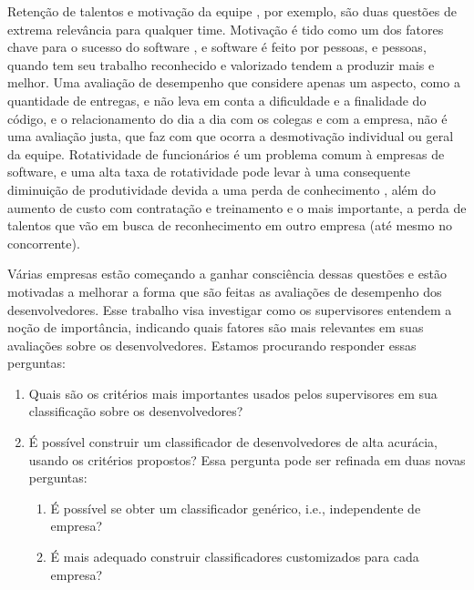 Retenção de talentos \cite{Boehm2000, Chatzoglou1997, DeMarco1987, Guzzo1988, Scudder1991, Wohlin1995, Wohlin2001} e motivação da equipe \cite{Boehm1987, DeMarco1987, Boehm1984, Jones2000, Sharp2009, Boehm1982, Boehm1988, Hantos2000}, por exemplo, são duas questões de extrema relevância para qualquer time. Motivação é tido como um dos fatores chave para o sucesso do software \cite{Sharp2009}, e software é feito por pessoas, e pessoas, quando tem seu trabalho reconhecido e valorizado tendem a produzir mais e melhor. Uma avaliação de desempenho que considere apenas um aspecto, como a quantidade de entregas, e não leva em conta a dificuldade e a finalidade do código, e o relacionamento do dia a dia com os colegas e com a empresa, não é uma avaliação justa, que faz com que ocorra a desmotivação individual ou geral da equipe. Rotatividade de funcionários é um problema comum à empresas de software\cite{Abdel-Hamid1991, Wallace2004}, e uma alta taxa de rotatividade pode levar à uma consequente diminuição de produtividade devida a uma perda de conhecimento \cite{Melo2011, Coram2005}, além do aumento de custo com contratação e treinamento e o mais importante, a perda de talentos que vão em busca de reconhecimento em outro empresa (até mesmo no concorrente).

Várias empresas estão começando a ganhar consciência dessas questões e estão motivadas a melhorar a forma que são feitas as avaliações de desempenho dos desenvolvedores. Esse trabalho visa investigar como os supervisores entendem a noção de importância, indicando quais fatores são mais relevantes em suas avaliações sobre os desenvolvedores. Estamos procurando responder essas perguntas:

\begin{enumerate}
	\item Quais são os critérios mais importantes usados pelos supervisores em sua classificação sobre os desenvolvedores?
	\item É possível construir um classificador de desenvolvedores de alta acurácia, usando os critérios propostos? Essa pergunta pode ser refinada em duas novas perguntas:
	\begin{enumerate}
		\item É possível se obter um classificador genérico, i.e., independente de empresa?
		\item É mais adequado construir classificadores customizados para cada empresa?
	\end{enumerate}
\end{enumerate}



